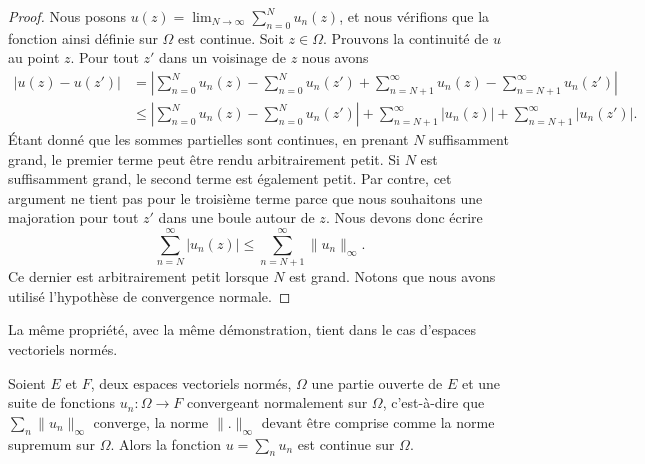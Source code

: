\begin{proof}
    Nous posons \( u(z)=\lim_{N\to \infty} \sum_{n=0}^N u_n(z)\), et nous vérifions que la fonction ainsi définie sur \( \Omega\) est continue. Soit \( z\in \Omega\). Prouvons la continuité de \( u\) au point \( z\). Pour tout \( z'\) dans un voisinage de \( z\) nous avons
    \begin{subequations}
        \begin{align}
            \big| u(z)-u(z') \big|&=\left| \sum_{n=0}^{N}u_n(z)-\sum_{n=0}^{N}u_n(z')+\sum_{n=N+1}^{\infty}u_n(z)-\sum_{n=N+1}^{\infty}u_n(z') \right| \\
            &\leq \left| \sum_{n=0}^N u_n(z)-\sum_{n=0}^Nu_n(z') \right| +\sum_{n=N+1}^{\infty}| u_n(z) |+\sum_{n=N+1}^{\infty}| u_n(z') |.
        \end{align}
    \end{subequations}
    Étant donné que les sommes partielles sont continues, en prenant \( N\) suffisamment grand, le premier terme peut être rendu arbitrairement petit. Si \( N\) est suffisamment grand, le second terme est également petit. Par contre, cet argument ne tient pas pour le troisième terme parce que nous souhaitons une majoration pour tout \( z'\) dans une boule autour de \( z\). Nous devons donc écrire
    \begin{equation}
        \sum_{n=N}^{\infty}| u_n(z) |\leq \sum_{n=N+1}^{\infty}\| u_n \|_{\infty}.
    \end{equation}
    Ce dernier est arbitrairement petit lorsque \( N\) est grand. Notons que nous avons utilisé l'hypothèse de convergence normale.
\end{proof}

La même propriété, avec la même démonstration, tient dans le cas d'espaces vectoriels normés.

\begin{proposition} \label{PropOMBbwst}
    Soient \( E\) et \( F\), deux espaces vectoriels normés, \( \Omega\) une partie ouverte de \( E\) et une suite de fonctions \( u_n\colon \Omega\to F\) convergeant normalement sur \( \Omega\), c'est-à-dire que \( \sum_n\| u_n \|_{\infty}\) converge, la norme \( \| . \|_{\infty} \) devant être comprise comme la norme supremum sur \( \Omega\). Alors la fonction \( u=\sum_nu_n\) est continue sur \( \Omega\).
\end{proposition}

